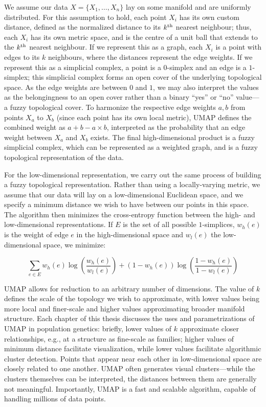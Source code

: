 We assume our data $X = \{X_{1}, \dots, X_{n}\}$ lay on some manifold and are uniformly distributed. For this assumption to hold, each point $X_{i}$ has its own custom distance, defined as the normalized distance to its $k\textsuperscript{th}$ nearest neighbour; thus, each $X_{i}$ has its own metric space, and is the centre of a unit ball that extends to the $k\textsuperscript{th}$ nearest neighbour. If we represent this as a graph, each $X_i$ is a point with edges to its $k$ neighbours, where the distances represent the edge weights. If we represent this as a simplicial complex, a point is a $0$-simplex and an edge is a $1$-simplex; this simplicial complex forms an open cover of the underlying topological space. As the edge weights are between $0$ and $1$, we may also interpret the values as the belongingness to an open cover rather than a binary ``yes'' or ``no'' value---a fuzzy topological cover. To harmonize the respective edge weights $a, b$ from points $X_{a}$ to $X_{b}$ (since each point has its own local metric), UMAP defines the combined weight as $a + b - a \times b$, interpreted as the probability that an edge weight between $X_{a}$ and $X_{b}$ exists. The final high-dimensional product is a fuzzy simplicial complex, which can be represented as a weighted graph, and is a fuzzy topological representation of the data.

For the low-dimensional representation, we carry out the same process of building a fuzzy topological representation. Rather than using a locally-varying metric, we assume that our data will lay on a low-dimensional Euclidean space, and we specify a minimum distance we wish to have between our points in this space. The algorithm then minimizes the cross-entropy function between the high- and low-dimensional representations. If $E$ is the set of all possible $1$-simplices, $w_{h}(e)$ is the weight of edge $e$ in the high-dimensional space and $w_{l}(e)$ the low-dimensional space, we minimize:

$$ \sum_{e \in E} w_{h}(e) \log{\left(\frac{w_{h}(e)}{w_{l}(e)}\right)} + (1 - w_{h}(e)) \log{\left(\frac{1 - w_{h}(e)}{1 - w_{l}(e)}\right)} $$

UMAP allows for reduction to an arbitrary number of dimensions. The value of $k$ defines the scale of the topology we wish to approximate, with lower values being more local and finer-scale and higher values approximating broader manifold structure. Each chapter of this thesis discusses the uses and parametrizations of UMAP in population genetics: briefly, lower values of $k$ approximate closer relationships, e.g., at a structure as fine-scale as families; higher values of minimum distance facilitate visualization, while lower values facilitate algorithmic cluster detection. Points that appear near each other in low-dimensional space are closely related to one another. UMAP often generates visual clusters---while the clusters themselves can be interpreted, the distances between them are generally not meaningful. Importantly, UMAP is a fast and scalable algorithm, capable of handling millions of data points.

